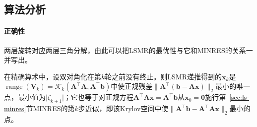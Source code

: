 \subsection{算法分析}

\paragraph{正确性}
两层旋转对应两层三角分解，由此可以把LSMR的最优性与它和MINRES的关系一并写出。

\begin{theorem}[LSMR的最小正规残差性及与MINRES的等价]
\label{thm:ls-lsmr-minres-equivalence}
在精确算术中，设双对角化在第$k$轮之前没有终止。则LSMR递推得到的$\bm x_k$是$\operatorname{range}(\bm V_k)=\mathcal K_k(\bm A^\top\bm A,\bm A^\top\bm b)$中使正规残差$\lVert\bm A^\top(\bm b-\bm A\bm x)\rVert_2$最小的唯一点，最小值为$\lvert\bar\zeta_{k+1}\rvert$；它也等于对正规方程$\bm A^\top\bm A\bm x=\bm A^\top\bm b$从$\bm x_0=\bm0$施行第~\ref{sec:ls-minres}节MINRES的第$k$步近似，即该Krylov空间中使$\lVert\bm A^\top\bm b-\bm A^\top\bm A\bm x\rVert_2$最小的点。
\end{theorem}

